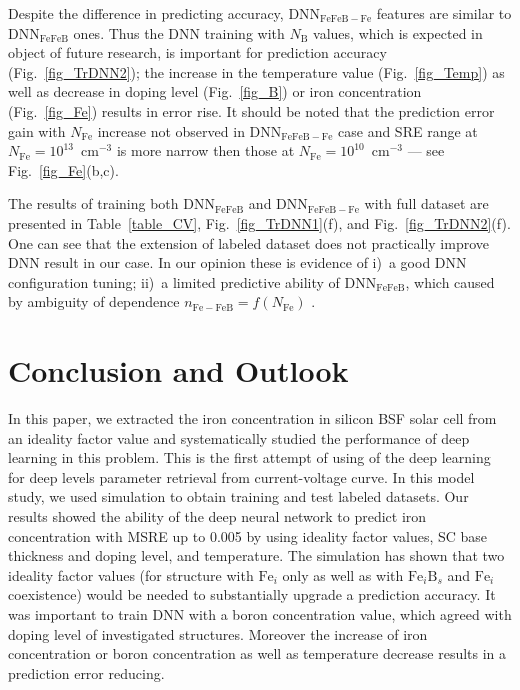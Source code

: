 \documentclass[a4paper,fleqn]{cas-sc}
\begin{document}
Despite the difference in predicting accuracy,
DNN$_\mathrm{FeFeB-Fe}$ features are similar to DNN$_\mathrm{FeFeB}$ ones.
Thus
the DNN training with $N_\mathrm{B}$ values, which is expected in object of future research,
is important for prediction accuracy (Fig.~\ref{fig_TrDNN2});
the increase in the temperature value (Fig.~\ref{fig_Temp}) as well as decrease
in doping level (Fig.~\ref{fig_B}) or iron concentration (Fig.~\ref{fig_Fe})
results in error rise.
It should be noted that the prediction error gain with $N_\mathrm{Fe}$ increase not observed in DNN$_\mathrm{FeFeB-Fe}$ case and SRE range at $N_\mathrm{Fe}=10^{13}$~cm$^{-3}$ is more narrow then those at $N_\mathrm{Fe}=10^{10}$~cm$^{-3}$ --- see Fig.~\ref{fig_Fe}(b,c).

The results of training both DNN$_\mathrm{FeFeB}$ and DNN$_\mathrm{FeFeB-Fe}$ with full dataset
are presented in Table~\ref{table_CV}, Fig.~\ref{fig_TrDNN1}(f), and Fig.~\ref{fig_TrDNN2}(f).
One can see that the extension of labeled dataset does not practically improve DNN result in our case.
In our opinion these is evidence of
i)~a good DNN configuration tuning;
ii)~a limited predictive ability of DNN$_\mathrm{FeFeB}$,
which caused by ambiguity of dependence $n_\mathrm{Fe-FeB}=f(N_\mathrm{Fe})$ .


\section{Conclusion and Outlook}
In this paper,
we extracted the iron concentration in silicon BSF solar cell from an
ideality factor value and systematically studied the performance
of deep learning in this problem.
This is the first attempt of using of the deep learning for deep levels parameter
retrieval from current-voltage curve.
In this model study, we used simulation to obtain training and test labeled datasets.
Our results showed the ability of the deep neural network
to predict iron concentration with MSRE up to 0.005 by using ideality factor values,
SC base thickness and doping level, and temperature.
The simulation has shown that two ideality factor values (for structure with $\mathrm{Fe}_i$ only as well as with $\mathrm{Fe}_i\mathrm{B}_s$ and $\mathrm{Fe}_i$ coexistence) would be needed to substantially upgrade a prediction accuracy.
It was important to train DNN with a boron concentration value,
which agreed with doping level of investigated structures.
Moreover the increase of iron concentration or boron concentration as well as temperature decrease
results in a prediction error reducing.
\end{document}
